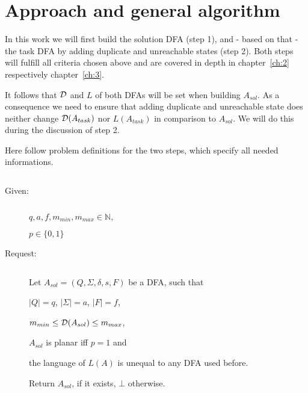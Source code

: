 \section{Approach and general algorithm}

In this work we will first build the solution DFA (step 1), and - based on that - the task DFA by adding duplicate and unreachable states (step 2). Both steps will fulfill all criteria chosen above and are covered in depth in chapter~\ref{ch:2} respectively chapter~\ref{ch:3}.

It follows that $\mathcal{D}$ and $L$ of both DFAs will be set when building $A_{sol}$. As a consequence we need to ensure that adding duplicate and unreachable state does neither change $\mathcal{D}(A_{task})$ nor $L(A_{task})$ in comparison to $A_{sol}$. We will do this during the discussion of step 2.

Here follow problem definitions for the two steps, which specify all needed informations.  %

\begin{definition}[BuildNewMinimalDFA] $ $
	\begin{description}
		
		\item[Given:] $ $
		
		$q, a, f, m_{min}, m_{max} \in \mathbb{N},$
		
		$p \in \{0,1\}$
		\item[Request:] $ $
		
		Let $A_{sol} = (Q, \Sigma, \delta, s, F)$ be a DFA, such that
		
		\qquad $|Q|=q$, $|\Sigma|=a$, $|F|=f$,
		
		\qquad $m_{min} \le \mathcal{D}(A_{sol}) \le m_{max}$,
		
		\qquad $A_{sol}$ is planar iff $p = 1$ and
		
		\qquad the language of $L(A)$ is unequal to any DFA used before.
		
		Return $A_{sol}$, if it exists, $\bot$ otherwise.
	\end{description}
\end{definition}

